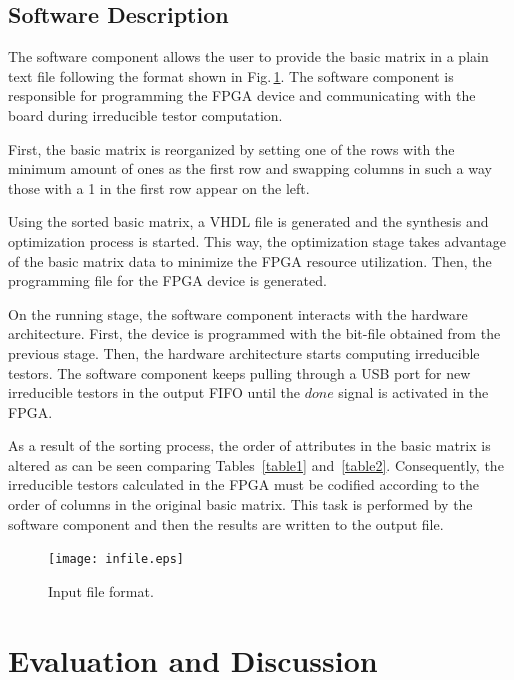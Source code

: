 \documentclass[authoryear,preprint,review,12pt]{elsarticle}
\begin{document}
\subsection{Software Description}
\label{sect:5}

The software component allows the user to provide the basic matrix in a 
plain text file following the format shown in Fig.\,\ref{fig:8}. The software component is responsible for 
programming the FPGA device and communicating with the board during irreducible testor computation.

First, the basic matrix is reorganized by setting one of the rows with the minimum amount of ones as the 
first row and swapping columns in such a way those with a 1 in the first row appear on the left. 

Using the sorted basic matrix, a VHDL file is generated and the synthesis and optimization process is started.
This way, the optimization stage takes advantage of the basic matrix data to minimize the FPGA resource 
utilization. Then, the programming file for the FPGA device is generated.

On the running stage, the software component interacts with the hardware architecture. 
First, the device is programmed with the bit-file obtained from the previous stage. Then, the
hardware architecture starts computing irreducible testors. 
The software component keeps pulling through a USB port for new irreducible testors in the output 
FIFO until the $done$ signal is activated in the FPGA.

As a result of the sorting process, the order of attributes in the basic matrix is altered as can 
be seen comparing Tables~\ref{table1} and~\ref{table2}. Consequently, the irreducible testors calculated 
in the FPGA must be codified according to the order of columns in the original basic matrix. This task 
is performed by the software component and then the results are written to the output file.

\begin{figure}[t]
    \begin{center}
       \texttt{[image: infile.eps]}
    \end{center}
\caption{Input file format.}
\label{fig:8}
\end{figure}

\section{Evaluation and Discussion}
\label{sect:6}
\end{document}
